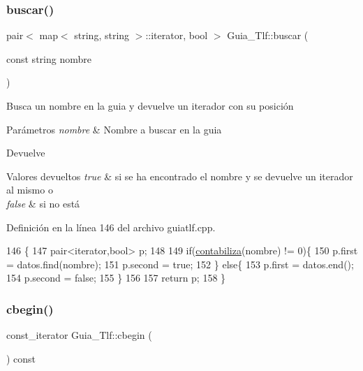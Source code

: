 \subsubsection{\texorpdfstring{buscar()}{buscar()}}
{\footnotesize\ttfamily pair$<$ map$<$ string, string $>$\+::iterator, bool $>$ Guia\+\_\+\+Tlf\+::buscar (\begin{DoxyParamCaption}\item[{const string}]{nombre }\end{DoxyParamCaption})}

Busca un nombre en la guia y devuelve un iterador con su posición 
\begin{DoxyParams}{Parámetros}
{\em nombre} & Nombre a buscar en la guia \\
\hline
\end{DoxyParams}
\begin{DoxyReturn}{Devuelve}

\end{DoxyReturn}

\begin{DoxyRetVals}{Valores devueltos}
{\em true} & si se ha encontrado el nombre y se devuelve un iterador al mismo o \\
\hline
{\em false} & si no está \\
\hline
\end{DoxyRetVals}


Definición en la línea 146 del archivo guiatlf.\+cpp.


\begin{DoxyCode}
146                                                                            \{
147      pair<iterator,bool> p;
148      
149      \textcolor{keywordflow}{if}(\hyperlink{classGuia__Tlf_aa63213524c6339ea89baae2b5d2ebb69}{contabiliza}(nombre) != 0)\{
150          p.first = datos.find(nombre);
151          p.second = \textcolor{keyword}{true};
152      \} \textcolor{keywordflow}{else}\{
153          p.first = datos.end();
154          p.second = \textcolor{keyword}{false};
155      \}
156          
157         \textcolor{keywordflow}{return} p;
158  \}
\end{DoxyCode}
\mbox{\label{classGuia__Tlf_a6fc1cd1e07ea139a5aec83882f73b3b4}} 
\subsubsection{\texorpdfstring{cbegin()}{cbegin()}}
{\footnotesize\ttfamily const\+\_\+iterator Guia\+\_\+\+Tlf\+::cbegin (\begin{DoxyParamCaption}{ }\end{DoxyParamCaption}) const\hspace{0.3cm}{\ttfamily [inline]}}



